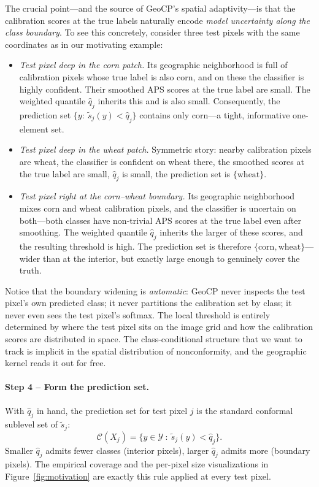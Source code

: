 \documentclass[11pt]{article}
\newcommand{\1}{\mathbf{1}}
\begin{document}
The crucial point---and the source of GeoCP's spatial adaptivity---is that the calibration scores at the true labels naturally encode \emph{model uncertainty along the class boundary}. To see this concretely, consider three test pixels with the same coordinates as in our motivating example:
\begin{itemize}[topsep=2pt,itemsep=2pt,leftmargin=1.5em]
    \item \emph{Test pixel deep in the corn patch.} Its geographic neighborhood is full of calibration pixels whose true label is also corn, and on these the classifier is highly confident. Their smoothed APS scores at the true label are small. The weighted quantile $\hat q_j$ inherits this and is also small. Consequently, the prediction set $\{y :\ \tilde s_j(y) < \hat q_j\}$ contains only corn---a tight, informative one-element set.
    \item \emph{Test pixel deep in the wheat patch.} Symmetric story: nearby calibration pixels are wheat, the classifier is confident on wheat there, the smoothed scores at the true label are small, $\hat q_j$ is small, the prediction set is $\{\text{wheat}\}$.
    \item \emph{Test pixel right at the corn--wheat boundary.} Its geographic neighborhood mixes corn and wheat calibration pixels, and the classifier is uncertain on both---both classes have non-trivial APS scores at the true label even after smoothing. The weighted quantile $\hat q_j$ inherits the larger of these scores, and the resulting threshold is high. The prediction set is therefore $\{\text{corn}, \text{wheat}\}$---wider than at the interior, but exactly large enough to genuinely cover the truth.
\end{itemize}
Notice that the boundary widening is \emph{automatic}: GeoCP never inspects the test pixel's own predicted class; it never partitions the calibration set by class; it never even sees the test pixel's softmax. The local threshold is entirely determined by where the test pixel sits on the image grid and how the calibration scores are distributed in space. The class-conditional structure that we want to track is implicit in the spatial distribution of nonconformity, and the geographic kernel reads it out for free.

\paragraph{Step 4 -- Form the prediction set.}
With $\hat q_j$ in hand, the prediction set for test pixel $j$ is the standard conformal sublevel set of $\tilde s_j$:
\begin{equation}
    \mathcal{C}(X_j) = \{y \in \mathcal{Y}\ :\ \tilde s_j(y) < \hat q_j\}.
\end{equation}
Smaller $\hat q_j$ admits fewer classes (interior pixels), larger $\hat q_j$ admits more (boundary pixels). The empirical coverage and the per-pixel size visualizations in Figure~\ref{fig:motivation} are exactly this rule applied at every test pixel.
\end{document}
